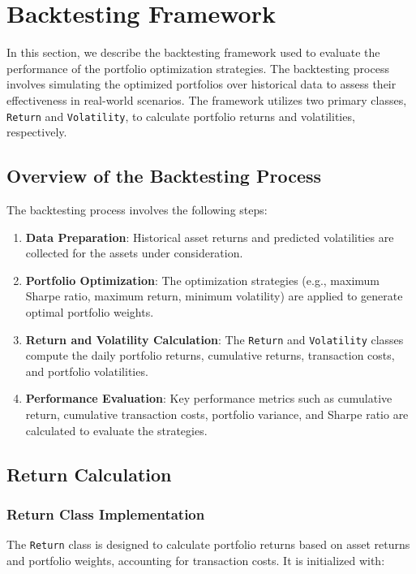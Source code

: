 \section{Backtesting Framework}

In this section, we describe the backtesting framework used to evaluate the performance of the portfolio optimization strategies. The backtesting process involves simulating the optimized portfolios over historical data to assess their effectiveness in real-world scenarios. The framework utilizes two primary classes, \texttt{Return} and \texttt{Volatility}, to calculate portfolio returns and volatilities, respectively.

\subsection{Overview of the Backtesting Process}

The backtesting process involves the following steps:

\begin{enumerate}
    \item \textbf{Data Preparation}: Historical asset returns and predicted volatilities are collected for the assets under consideration.
    \item \textbf{Portfolio Optimization}: The optimization strategies (e.g., maximum Sharpe ratio, maximum return, minimum volatility) are applied to generate optimal portfolio weights.
    \item \textbf{Return and Volatility Calculation}: The \texttt{Return} and \texttt{Volatility} classes compute the daily portfolio returns, cumulative returns, transaction costs, and portfolio volatilities.
    \item \textbf{Performance Evaluation}: Key performance metrics such as cumulative return, cumulative transaction costs, portfolio variance, and Sharpe ratio are calculated to evaluate the strategies.
\end{enumerate}

\subsection{Return Calculation}

\subsubsection{Return Class Implementation}

The \texttt{Return} class is designed to calculate portfolio returns based on asset returns and portfolio weights, accounting for transaction costs. It is initialized with:

